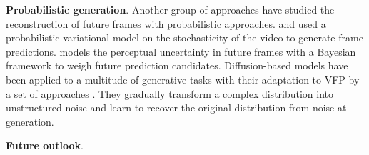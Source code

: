 \documentclass[smallextended,twocolumn,natbib]{svjour3}
\begin{document}
\noindent
\textbf{Probabilistic generation}. Another group of approaches have studied the reconstruction of future frames with probabilistic approaches. \citet{babaeizadeh2018stochastic} and \citet{denton2018stochastic} used a probabilistic variational model on the stochasticity of the video to generate frame predictions. \citet{wang2020probabilistic} models the perceptual uncertainty in future frames with a Bayesian framework to weigh future prediction candidates. Diffusion-based models \citep{dhariwal2021diffusion,ho2020denoising,rombach2022high} have been applied to a multitude of generative tasks with their adaptation to VFP by a set of approaches \citep{gu2023seer,hoppe2024diffusion,shrivastava2024video,voleti2022mcvd,ye2024stdiff,zhang2024extdm}. They gradually transform a complex distribution into unstructured noise and learn to recover the original distribution from noise at generation. 

\noindent
\textbf{Future outlook}.
\end{document}
